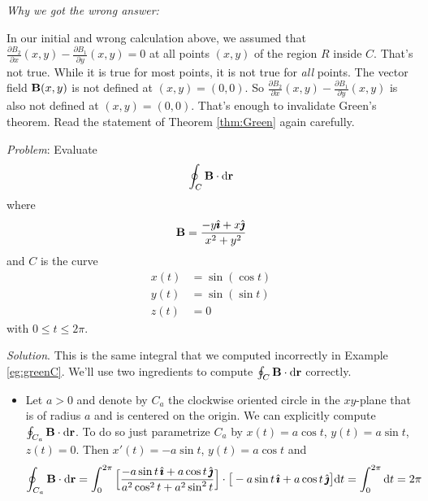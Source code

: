 \begin{eg}
\medskip
\noindent
\emph{Why we got the wrong answer:}

\noindent
In our initial and wrong calculation above, we assumed that 
$\frac{\partial B_2}{\partial x}(x,y) 
                - \frac{\partial B_1}{\partial y}(x,y)=0$
at all points $(x,y)$ of the region $R$ inside $C$. That's not true.
While it is true for most points, it is not true for  \emph{all} points.
The vector field $\mathbf{B}(x,y)$ is not defined at $(x,y)=(0,0)$.
So $\frac{\partial B_2}{\partial x}(x,y) 
                - \frac{\partial B_1}{\partial y}(x,y)$
is also not defined at $(x,y)=(0,0)$. That's enough to invalidate
Green's theorem. Read the statement of Theorem \ref{thm:Green} again carefully.

\end{eg}

\begin{eg}\label{eg:greenCC}
\noindent\textit{Problem}:
Evaluate
\begin{equation*}
\oint_C\mathbf{B}\cdot\mathrm{d}\mathbf{r}
\end{equation*}
where
\begin{equation*}
\mathbf{B} = \frac{-y\hat{\pmb{\imath}}+x\hat{\pmb{\jmath}}}{x^2+y^2}
\end{equation*}
and $C$ is the curve
\begin{align*}
x(t) &= \sin(\cos t) \\
y(t) &= \sin(\sin t) \\
z(t) &= 0
\end{align*}
with $0\le t\le 2\pi$.

\medskip
\noindent\textit{Solution}.
This is the same integral that we computed incorrectly in Example
 \ref{eg:greenC}.
We'll use two ingredients to compute $\oint_C\mathbf{B}\cdot\mathrm{d}\mathbf{r}$
correctly.

\begin{itemize}\itemsep1pt \parskip0pt  %
\item
Let $a>0$ and denote by $C_a$ the clockwise oriented circle in 
the $xy$-plane that is of radius $a$ and is centered on the origin. 
We can explicitly compute
$\oint_{C_a}\mathbf{B}\cdot\mathrm{d}\mathbf{r}$. To do so just parametrize 
$C_a$ by $x(t)=a\cos t$, $y(t) = a\sin t$, $z(t)=0$. Then
$x'(t)=-a\sin t$, $y(t) = a\cos t$ and
\begin{align*}
\oint_{C_a}\mathbf{B}\cdot\mathrm{d}\mathbf{r}
&=\int_0^{2\pi}\Big[\frac{-a\sin t\,\hat{\pmb{\imath}}+a\cos t\,\hat{\pmb{\jmath}}}
                            {a^2\cos^2t+a^2\sin^2t}\Big]
           \cdot\big[-a\sin t\,\hat{\pmb{\imath}}+a\cos t\,\hat{\pmb{\jmath}}\big]
           \mathrm{d}t
=\int_0^{2\pi}\mathrm{d}t=2\pi
\end{align*}


\end{itemize}
\end{eg}
